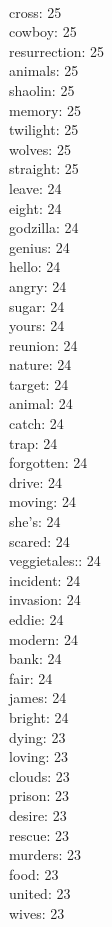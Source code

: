 \begin{multicols}{6}
  \\ cross: 25
  \\ cowboy: 25
  \\ resurrection: 25
  \\ animals: 25
  \\ shaolin: 25
  \\ memory: 25
  \\ twilight: 25
  \\ wolves: 25
  \\ straight: 25
  \\ leave: 24
  \\ eight: 24
  \\ godzilla: 24
  \\ genius: 24
  \\ hello: 24
  \\ angry: 24
  \\ sugar: 24
  \\ yours: 24
  \\ reunion: 24
  \\ nature: 24
  \\ target: 24
  \\ animal: 24
  \\ catch: 24
  \\ trap: 24
  \\ forgotten: 24
  \\ drive: 24
  \\ moving: 24
  \\ she's: 24
  \\ scared: 24
  \\ veggietales:: 24
  \\ incident: 24
  \\ invasion: 24
  \\ eddie: 24
  \\ modern: 24
  \\ bank: 24
  \\ fair: 24
  \\ james: 24
  \\ bright: 24
  \\ dying: 23
  \\ loving: 23
  \\ clouds: 23
  \\ prison: 23
  \\ desire: 23
  \\ rescue: 23
  \\ murders: 23
  \\ food: 23
  \\ united: 23
  \\ wives: 23

\end{multicols}
